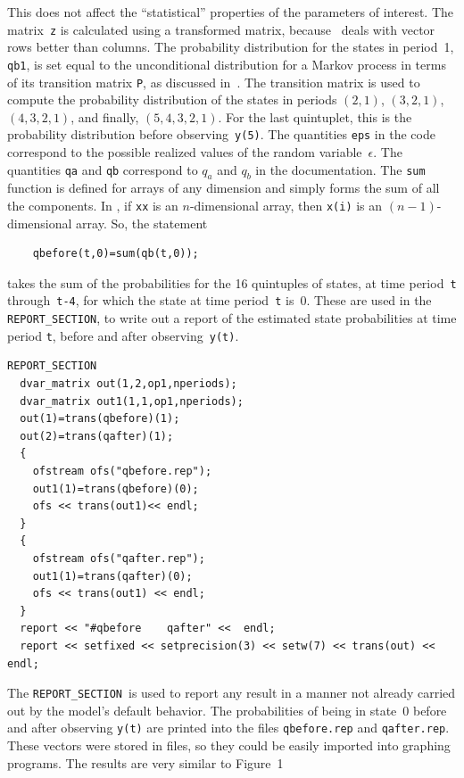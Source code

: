 \documentclass{admbmanual}
\newcommand\RS{\texttt{REPORT\_SECTION}}
\begin{document}
This does not affect the ``statistical'' properties of the parameters of
interest. The matrix~\texttt{z} is calculated using a transformed matrix,
because \ADM\ deals with vector rows better than columns. The probability
distribution for the states in period~1, \texttt{qb1}, is set equal to the
unconditional distribution for a Markov process in terms of its transition
matrix \texttt{P}, as discussed in~\cite{hamilton1994}. The transition matrix is
used to compute the probability distribution of the states in periods $(2,1)$,
$(3,2,1)$, $(4,3,2,1)$, and finally, $(5,4,3,2,1)$. For the last quintuplet,
this is the probability distribution before observing~\texttt{y(5)}. The
quantities \texttt{eps} in the code correspond to the possible realized values
of the random variable~$\epsilon$. The quantities \texttt{qa} and \texttt{qb}
correspond to $q_a$ and $q_b$ in the documentation. The \texttt{sum} function is
defined for arrays of any dimension and simply forms the sum of all the
components. In \ADM, if \texttt{xx} is an $n$-dimensional array, then
\texttt{x(i)} is an $(n-1)$-dimensional array. So, the statement
\begin{lstlisting}
    qbefore(t,0)=sum(qb(t,0));
\end{lstlisting}
takes the sum of the probabilities for the 16 quintuples of states, at time
period~\texttt{t} through~\texttt{t-4}, for which the state at time
period~\texttt{t} is~$0$. These are used in the \RS, to write out a report of
the estimated state probabilities at time period \texttt{t}, before and after
observing~\texttt{y(t)}.
\begin{lstlisting}
REPORT_SECTION
  dvar_matrix out(1,2,op1,nperiods);
  dvar_matrix out1(1,1,op1,nperiods);
  out(1)=trans(qbefore)(1);
  out(2)=trans(qafter)(1);
  {
    ofstream ofs("qbefore.rep");
    out1(1)=trans(qbefore)(0);
    ofs << trans(out1)<< endl;
  }
  {
    ofstream ofs("qafter.rep");
    out1(1)=trans(qafter)(0);
    ofs << trans(out1) << endl;
  }
  report << "#qbefore    qafter" <<  endl;
  report << setfixed << setprecision(3) << setw(7) << trans(out) << endl;
\end{lstlisting}
The \RS\ is used to report any result in a manner not already carried out by the
model's default behavior. The probabilities of being in state~$0$ before and
after observing \texttt{y(t)} are printed into the files \texttt{qbefore.rep}
and \texttt{qafter.rep}. These vectors were stored in files, so they could be
easily imported into graphing programs. The results are very similar to Figure~1
\end{document}
